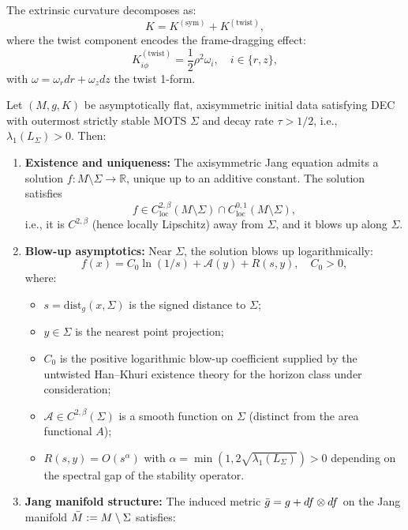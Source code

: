 The extrinsic curvature decomposes as:
\begin{equation}
K = K^{(\text{sym})} + K^{(\text{twist})},
\end{equation}
where the twist component encodes the frame-dragging effect:
\begin{equation}
K^{(\text{twist})}_{i\phi} = \frac{1}{2}\rho^2 \omega_i, \quad i \in \{r, z\},
\end{equation}
with $\omega = \omega_r dr + \omega_z dz$ the twist 1-form.

\begin{theorem}\label{thm:jang-exist}
Let $(M, g, K)$ be asymptotically flat, axisymmetric initial data satisfying DEC with outermost strictly stable MOTS $\Sigma$ and decay rate $\tau > 1/2$, i.e., $\lambda_1(L_\Sigma) > 0$. Then:
\begin{enumerate}[label=\textup{(\roman*)}]
    \item \textbf{Existence and uniqueness:} The axisymmetric Jang equation admits a solution $f: M \setminus \Sigma \to \mathbb{R}$, unique up to an additive constant. The solution satisfies
    \[
    f \in C^{2,\beta}_{\mathrm{loc}}(M \setminus \Sigma) \cap C^{0,1}_{\mathrm{loc}}(M \setminus \Sigma),
    \]
    i.e., it is $C^{2,\beta}$ (hence locally Lipschitz) away from $\Sigma$, and it blows up along $\Sigma$.
    \item \textbf{Blow-up asymptotics:} Near $\Sigma$, the solution blows up logarithmically:
    \[
    f(x) = C_0 \ln(1/s) + \mathcal{A}(y) + R(s,y), \quad C_0 > 0,
    \]
    where:
    \begin{itemize}
        \item $s = \mathrm{dist}_g(x, \Sigma)$ is the signed distance to $\Sigma$;
        \item $y \in \Sigma$ is the nearest point projection;
        \item $C_0$ is the positive logarithmic blow-up coefficient supplied by the untwisted Han--Khuri existence theory for the horizon class under consideration;
        \item $\mathcal{A} \in C^{2,\beta}(\Sigma)$ is a smooth function on $\Sigma$ (distinct from the area functional $A$);
        \item $R(s,y) = O(s^\alpha)$ with $\alpha = \min(1, 2\sqrt{\lambda_1(L_\Sigma)}) > 0$ depending on the spectral gap of the stability operator.
    \end{itemize}
    \item \textbf{Jang manifold structure:} The induced metric $\bar{g} = g + df \otimes df$ on the Jang manifold $\bar{M} := M \setminus \Sigma$ satisfies:

\end{enumerate}
\end{theorem}
